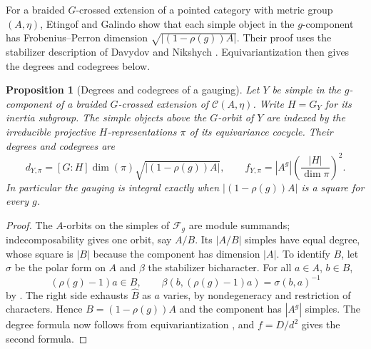 \documentclass[11pt,a4paper]{article}
\numberwithin{equation}{section}
\newtheorem{proposition}[theorem]{Proposition}
\theoremstyle{remark}
\newcommand{\C}{\mathcal C}
\begin{document}
For a braided $G$-crossed extension of a pointed category with metric
group $(A,\eta)$, Etingof and Galindo \cite[Lemma~4.2]{EGReflection}
show that each simple object in the $g$-component has Frobenius--Perron
dimension $\sqrt{|(1-\rho(g))A|}$. Their proof uses the stabilizer
description of Davydov and Nikshych \cite[Corollary~5.6 and Remark~5.7]{DNPicard}.
Equivariantization then gives the degrees and codegrees below.

\begin{proposition}[Degrees and codegrees of a gauging]\label{fam:M:13.1}\label{prop:gauged-degrees}
Let $Y$ be simple in the $g$-component of a braided $G$-crossed
extension of $\C(A,\eta)$. Write $H=G_Y$ for its inertia subgroup.
The simple objects above the $G$-orbit of $Y$ are indexed by the
irreducible projective $H$-representations $\pi$ of its equivariance
cocycle. Their degrees and codegrees are
\[
 d_{Y,\pi}=[G:H]\dim(\pi)\sqrt{|(1-\rho(g))A|},\qquad
 f_{Y,\pi}=|A^{g}|\left(\frac{|H|}{\dim\pi}\right)^2 .
\]
In particular the gauging is integral exactly when $|(1-\rho(g))A|$
is a square for every $g$.
\end{proposition}
\begin{proof}
The $A$-orbits on the simples of $\mathcal F_g$ are module summands;
indecomposability gives one orbit, say $A/B$. Its $|A/B|$ simples
have equal degree, whose square is $|B|$ because the component has
dimension $|A|$. To identify $B$, let $\sigma$ be the polar form on
$A$ and $\beta$ the stabilizer bicharacter. For all $a\in A$, $b\in B$,
\[
 (\rho(g)-1)a\in B,\qquad
 \beta(b,(\rho(g)-1)a)=\sigma(b,a)^{-1}
\]
by \cite[Corollary~5.6 and Remark~5.7]{DNPicard}. The right side
exhausts $\widehat B$ as $a$ varies, by nondegeneracy and restriction
of characters. Hence $B=(1-\rho(g))A$ and the component has
$|A^g|$ simples. The degree formula now follows from equivariantization
\cite[Corollary~2.13]{BNEquiv}, and $f=D/d^2$ gives the second formula.
\end{proof}
\end{document}
